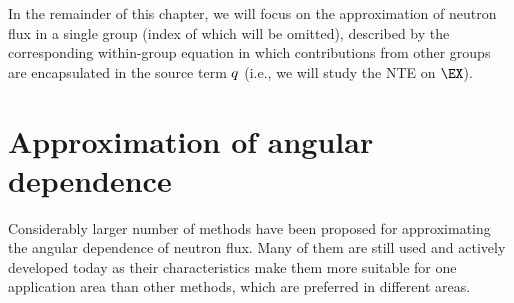 In the remainder
of this chapter, we will focus on the approximation of neutron flux in a single
group (index of which will be omitted), described by the corresponding within-group equation in which contributions from
other groups are encapsulated in the source term $q$ (i.e., we will study the NTE on $\EX$).

\section{Approximation of angular dependence}

Considerably larger number of methods have been proposed for approximating the angular dependence of neutron
flux. Many of them are still used and actively developed today as their characteristics make them more suitable for one
application area than other methods, which are preferred in different areas.

